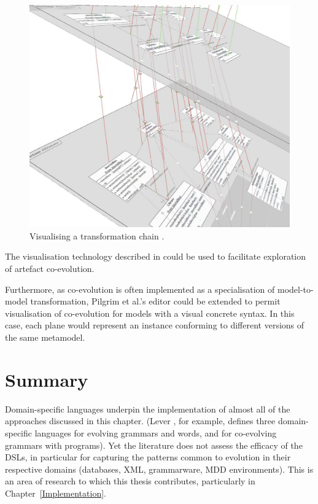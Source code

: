 \begin{figure}[htbp]
  \begin{center}
    \leavevmode
    \includegraphics[scale=0.25]{3.LiteratureReview/images/transformation-chain.png}
  \end{center}
  \caption{Visualising a transformation chain \cite{pilgrim08constructing}.}
  \label{fig:transformation-chains}
\end{figure}

The visualisation technology described in \cite{pilgrim08constructing} could be used to facilitate exploration of artefact co-evolution.

Furthermore, as co-evolution is often implemented as a specialisation of model-to-model transformation, Pilgrim et al.'s editor could be extended to permit visualisation of co-evolution for models with a visual concrete syntax. In this case, each plane would represent an instance conforming to different versions of the same metamodel.


\section{Summary}
\label{sec:literature_review_summary}
Domain-specific languages underpin the implementation of almost all of the approaches discussed in this chapter. (Lever \cite{pizka07automating}, for example, defines three domain-specific languages for evolving grammars and words, and for co-evolving grammars with programs). Yet the literature does not assess the efficacy of the DSLs, in particular for capturing the patterns common to evolution in their respective domains (databases, XML, grammarware, MDD environments). This is an area of research to which this thesis contributes, particularly in Chapter~\ref{Implementation}.

